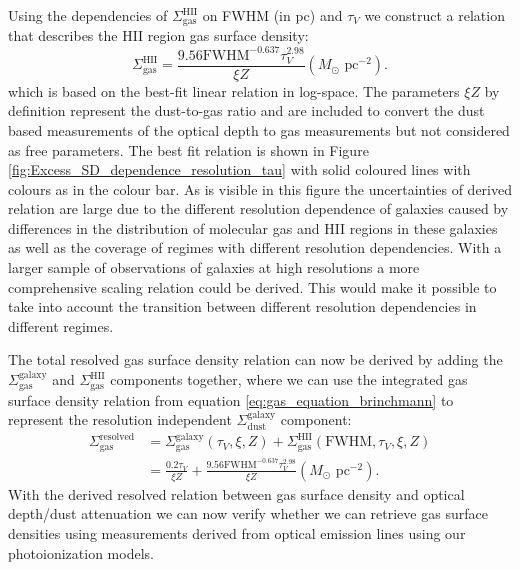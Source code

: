 \documentclass[fleqn,usenatbib]{mnras}
\begin{document}
Using the dependencies of $\Sigma_{\textrm{gas}}^{\textrm{HII}}$ on FWHM (in pc) and $\tau_V$ we construct a relation that describes the HII region gas surface density:
\begin{equation}
\label{eq:gas_equation_correction}
    \Sigma_{\textrm{gas}}^{\textrm{HII}} = \frac{9.56\textrm{FWHM}^{-0.637}\tau_{V}^{2.98}}{\xi Z} (M_{\odot}\textrm{ pc}^{-2}).
\end{equation}
which is based on the best-fit linear relation in log-space. The parameters $\xi Z$ by definition represent the dust-to-gas ratio and are included to convert the dust based measurements of the optical depth to gas measurements but not considered as free parameters. The best fit relation is shown in Figure \ref{fig:Excess_SD_dependence_resolution_tau} with solid coloured lines with colours as in the colour bar. As is visible in this figure the uncertainties of derived relation are large due to the different resolution dependence of galaxies caused by differences in the distribution of molecular gas and HII regions in these galaxies as well as the coverage of regimes with different resolution dependencies. With a larger sample of observations of galaxies at high resolutions a more comprehensive scaling relation could be derived. This would make it possible to take into account the transition between different resolution dependencies in different regimes. 

The total resolved gas surface density relation can now be derived by adding the $\Sigma_{\textrm{gas}}^{\textrm{galaxy}}$ and $\Sigma_{\textrm{gas}}^{\textrm{HII}}$ components together, where we can use the integrated gas surface density relation from equation \ref{eq:gas_equation_brinchmann} to represent the resolution independent $\Sigma_{\textrm{dust}}^{\textrm{galaxy}}$ component:
\begin{equation}
\label{eq:resolved_gas_equation}
\begin{split}
\Sigma_{\textrm{gas}}^{\textrm{resolved}} & = \Sigma_{\textrm{gas}}^{\textrm{galaxy}}(\tau_{V}, \xi, Z) + \Sigma_{\textrm{gas}}^{\textrm{HII}}(\textrm{FWHM}, \tau_{V}, \xi, Z) \\
 & =  \frac{0.2\tau_{V}}{\xi Z} + \frac{9.56\textrm{FWHM}^{-0.637}\tau_{V}^{2.98}}{\xi Z} (M_{\odot}\textrm{ pc}^{-2}).
\end{split}
\end{equation}
With the derived resolved relation between gas surface density and optical depth/dust attenuation we can now verify whether we can retrieve gas surface densities using measurements derived from optical emission lines using our photoionization models.
\end{document}
